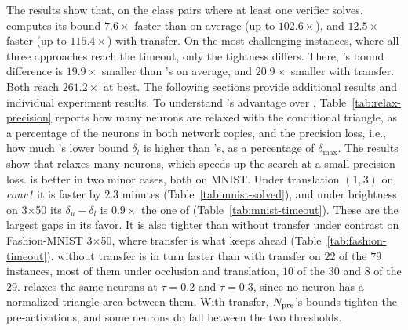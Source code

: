 The results show that, on the class pairs where at least one verifier solves, \tool computes its
bound $7.6\times$ faster than \baseline on average (up to $102.6\times$), and $12.5\times$ faster
(up to $115.4\times$) with transfer. On the most challenging
instances, where all three approaches reach the timeout, only the tightness differs.
There, \tool's bound difference is $19.9\times$ smaller than \baseline's on average,
and $20.9\times$ smaller with transfer. Both reach $261.2\times$ at best.
The following sections provide additional results and individual experiment results.
To understand \tool's advantage over \baseline, Table~\ref{tab:relax-precision}
reports how many neurons are relaxed with the conditional triangle, as a percentage of
the neurons in both network copies,
and the precision loss, i.e., how much \tool's lower bound $\delta_l$ is higher than \baseline's,
as a percentage of $\delta_{\max}$. The results show that \tool relaxes many neurons,
which speeds up the search at a small precision loss.
\baseline is better in two minor cases, both on MNIST. Under translation $(1,3)$ on
\emph{conv1} it is faster by $2.3$ minutes (Table~\ref{tab:mnist-solved}), and under
brightness on 3$\times$50 its $\delta_u{-}\delta_l$ is $0.9\times$ the one of \tool
(Table~\ref{tab:mnist-timeout}). These are the largest gaps in its favor. It is also
tighter than \tool without transfer under contrast on Fashion-MNIST 3$\times$50,
where transfer is what keeps \tool ahead (Table~\ref{tab:fashion-timeout}). \tool
without transfer is in turn faster than \tool with transfer on $22$ of the $79$
instances, most of them under occlusion and translation, $10$ of the $30$ and $8$ of
the $29$.
\tool relaxes the same neurons at $\tau{=}0.2$ and $\tau{=}0.3$, since no neuron
has a normalized triangle area between them. With transfer, $N_{\mathrm{pre}}$'s bounds
tighten the pre-activations, and some neurons do fall between the two thresholds.

